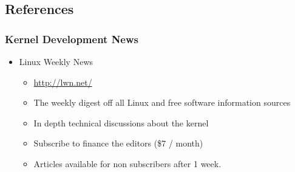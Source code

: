 \subsection{References}

\begin{frame}
  \frametitle{Kernel Development News}
  \begin{itemize}
  \item Linux Weekly News
    \begin{itemize}
    \item \url{http://lwn.net/}
    \item The weekly digest off all Linux and free software
      information sources
    \item In depth technical discussions about the kernel
    \item Subscribe to finance the editors (\$7 / month)
    \item Articles available for non subscribers after 1 week.
    \end{itemize}
  \end{itemize}
\end{frame}

